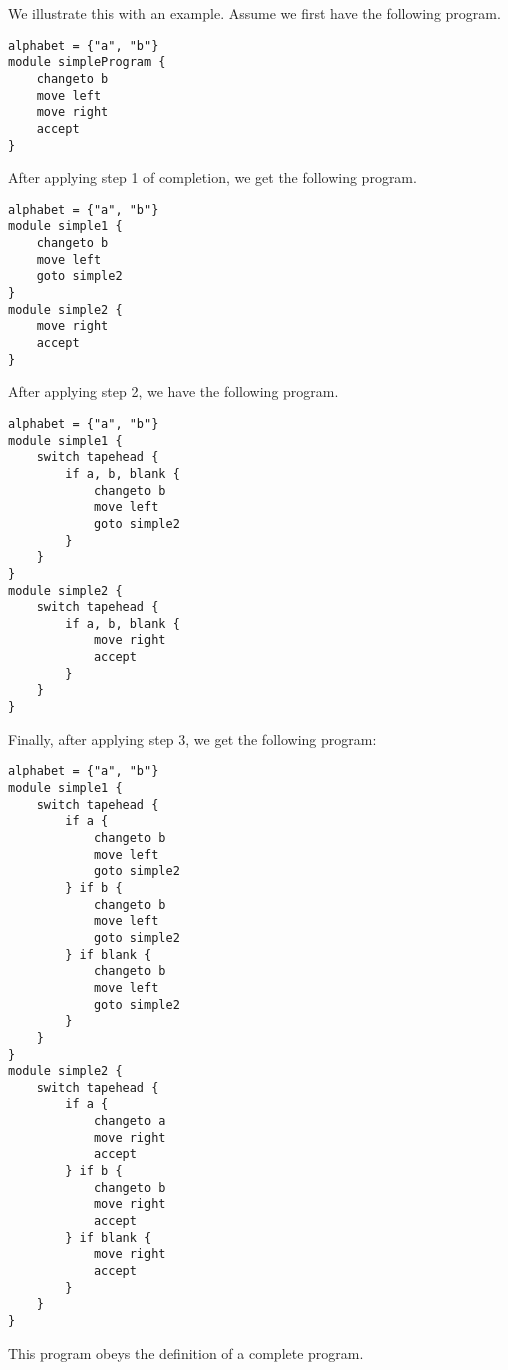We illustrate this with an example. Assume we first have the following program.
\begin{lstlisting}[language=TML]
alphabet = {"a", "b"}
module simpleProgram {
    changeto b
    move left
    move right
    accept
}
\end{lstlisting}
After applying step 1 of completion, we get the following program.
\begin{lstlisting}[language=TML]
alphabet = {"a", "b"}
module simple1 {
    changeto b
    move left
    goto simple2
}
module simple2 {
    move right
    accept
}
\end{lstlisting}
After applying step 2, we have the following program.
\begin{lstlisting}[language=TML]
alphabet = {"a", "b"}
module simple1 {
    switch tapehead {
        if a, b, blank {
            changeto b
            move left
            goto simple2
        }
    }
}
module simple2 {
    switch tapehead {
        if a, b, blank {
            move right
            accept
        }
    }
}
\end{lstlisting}
Finally, after applying step 3, we get the following program:
\begin{lstlisting}[language=TML]
alphabet = {"a", "b"}
module simple1 {
    switch tapehead {
        if a {
            changeto b
            move left
            goto simple2
        } if b {
            changeto b
            move left
            goto simple2
        } if blank {
            changeto b
            move left
            goto simple2
        }
    }
}
module simple2 {
    switch tapehead {
        if a {
            changeto a
            move right
            accept
        } if b {
            changeto b
            move right
            accept
        } if blank {
            move right
            accept
        }
    }
}
\end{lstlisting}
This program obeys the definition of a complete program.


